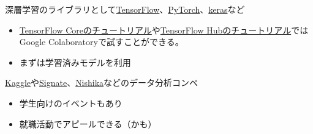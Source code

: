 \documentclass[
  xelatex,
  ja=standard]{bxjsarticle}
\providecommand{\tightlist}{%
  \setlength{\itemsep}{0pt}\setlength{\parskip}{0pt}}\usepackage{longtable,booktabs,array}
\begin{document}
深層学習のライブラリとして\href{https://www.tensorflow.org/}{TensorFlow}、\href{https://pytorch.org/}{PyTorch}、\href{https://keras.io/ja/}{keras}など

\begin{itemize}
\tightlist
\item
  \href{https://www.tensorflow.org/tutorials}{TensorFlow
  Coreのチュートリアル}や\href{https://www.tensorflow.org/hub/tutorials}{TensorFlow
  Hubのチュートリアル}ではGoogle Colaboratoryで試すことができる。
\item
  まずは学習済みモデルを利用
\end{itemize}

\href{https://www.kaggle.com/}{Kaggle}や\href{https://signate.jp/}{Signate}、\href{https://www.nishika.com/}{Nishika}などのデータ分析コンペ

\begin{itemize}
\tightlist
\item
  学生向けのイベントもあり
\item
  就職活動でアピールできる（かも）
\end{itemize}


  
\end{document}

